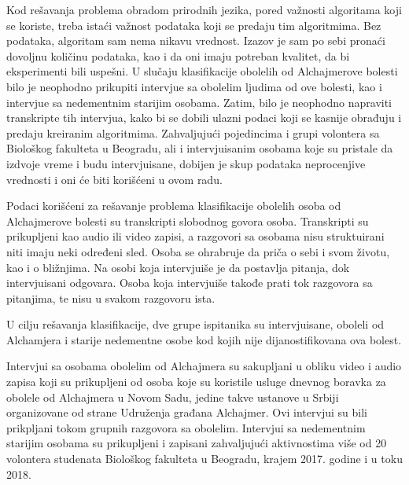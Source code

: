 \documentclass[12pt,oneside]{memoir}
\begin{document}
Kod rešavanja problema obradom prirodnih jezika, pored važnosti algoritama koji se koriste, treba istaći važnost podataka koji se predaju tim algoritmima.  Bez podataka,  algoritam sam nema nikavu vrednost.  Izazov je sam po sebi pronaći dovoljnu količinu podataka,  kao i da oni imaju potreban kvalitet,  da bi eksperimenti bili uspešni.  U slučaju klasifikacije obolelih od Alchajmerove bolesti bilo je neophodno prikupiti intervjue sa obolelim ljudima od ove bolesti,  kao i intervjue sa nedementnim starijim osobama.  Zatim, bilo je neophodno napraviti transkripte tih intervjua, kako bi se dobili ulazni podaci koji se kasnije obrađuju i predaju kreiranim algoritmima.  Zahvaljujući pojedincima i grupi volontera sa Biološkog fakulteta u Beogradu, ali i intervjuisanim osobama koje su pristale da izdvoje vreme i budu intervjuisane,  dobijen je skup podataka neprocenjive vrednosti i oni će biti korišćeni u ovom radu. 

Podaci korišćeni za rešavanje problema klasifikacije obolelih osoba od Alchajmerove bolesti su transkripti slobodnog govora osoba. Transkripti su prikupljeni kao audio ili video zapisi,  a razgovori sa osobama nisu struktuirani niti imaju neki određeni sled.  Osoba se ohrabruje da priča o sebi i svom životu,  kao i o bližnjima.  Na osobi koja intervjuiše je da postavlja pitanja,  dok intervjuisani odgovara.  Osoba koja intervjuiše takođe prati tok razgovora sa pitanjima,  te nisu u svakom razgovoru ista.  

U cilju rešavanja klasifikacije,  dve grupe ispitanika su intervjuisane,  oboleli od Alchamjera i starije nedementne osobe kod kojih nije dijanostifikovana ova bolest.  
\break

Intervjui sa osobama obolelim od Alchajmera su sakupljani u obliku video i audio zapisa koji su prikupljeni od osoba koje su koristile usluge dnevnog boravka za obolele od Alchajmera u Novom Sadu,  jedine takve ustanove u Srbiji organizovane od strane Udruženja građana Alchajmer.  Ovi intervjui su bili prikpljani tokom grupnih razgovora sa obolelim.  Intervjui sa nedementnim starijim osobama su prikupljeni i zapisani zahvaljujući aktivnostima više od 20 volontera studenata Biološkog fakulteta u Beogradu,  krajem 2017. godine i u toku 2018.
\end{document}

